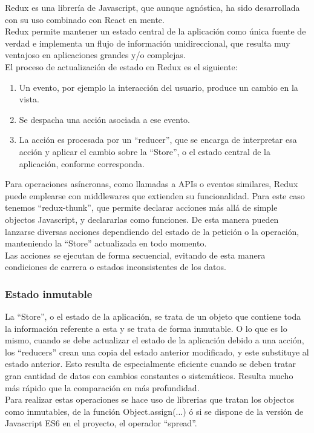 Redux es una librería de Javascript, que aunque agnóstica, ha sido desarrollada con su uso combinado con React en mente. \\ 

Redux permite mantener un estado central de la aplicación como única fuente de verdad e implementa un flujo de información unidireccional, que resulta muy ventajoso en aplicaciones grandes y/o complejas. \\

El proceso de actualización de estado en Redux es el siguiente: 

\begin{enumerate}  
	\item  Un evento, por ejemplo la interacción del usuario, produce un cambio en la vista.
	\item Se despacha una acción asociada a ese evento. 
	\item La acción es procesada por un \hyphenquote{spanish}{reducer}, que se encarga de interpretar esa acción y aplicar el cambio sobre la \hyphenquote{spanish}{Store}, o el estado central de la aplicación, conforme corresponda.
\end{enumerate}

Para operaciones asíncronas, como llamadas a APIs o eventos similares, Redux puede emplearse con middlewares que extienden su funcionalidad. Para este caso tenemos \hyphenquote{spanish}{redux-thunk}, que permite declarar acciones más allá de simple objectos Javascript, y declararlas como funciones. De esta manera pueden lanzarse diversas acciones dependiendo del estado de la petición o la operación, manteniendo la \hyphenquote{spanish}{Store} actualizada en todo momento. \\

Las acciones se ejecutan de forma secuencial, evitando de esta manera condiciones de carrera o estados inconsistentes de los datos. \\

\subsubsection {Estado inmutable}

La \hyphenquote{spanish}{Store}, o el estado de la aplicación, se trata de un objeto que contiene toda la información referente a esta y se trata de forma inmutable. O lo que es lo mismo, cuando se debe actualizar el estado de la aplicación debido a una acción, los \hyphenquote{spanish}{reducers} crean una copia del estado anterior modificado, y este substituye al estado anterior. Esto resulta de especialmente eficiente cuando se deben tratar gran cantidad de datos con cambios constantes o sistemáticos. Resulta mucho más rápido que la comparación en más profundidad. \\

Para realizar estas operaciones se hace uso de librerias que tratan los objectos como inmutables, de la función Object.assign(...) ó si se dispone de la versión de Javascript ES6 en el proyecto, el operador \hyphenquote{spanish}{spread}. \\

